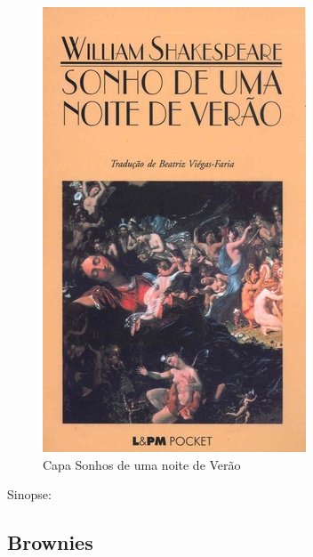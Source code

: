 \begin{figure}[htb]
	\caption{\label{sonhos_shakespeare} Capa Sonhos de uma noite de Verão}
	\begin{center}
	    \includegraphics[width=\textwidth/2]{imagens/Sonhos.jpg}
	\end{center}
\end{figure}


Sinopse:

\subsection{Brownies}

